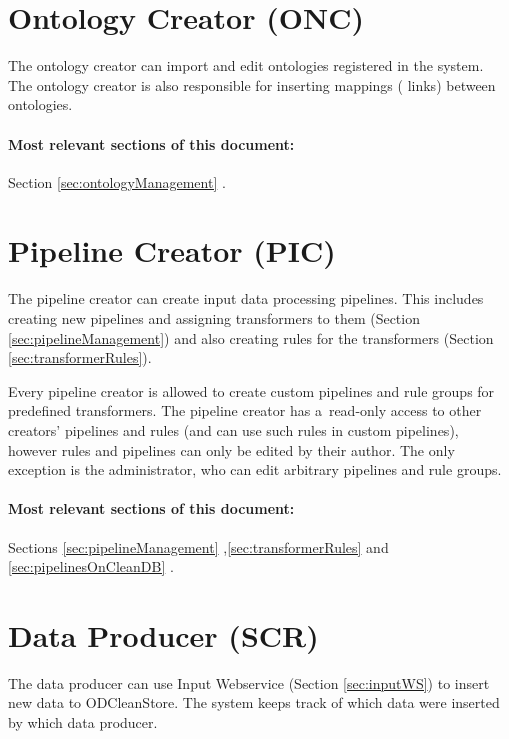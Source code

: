 \section[Ontology Creator]{Ontology Creator (ONC)}
\label{sec:onc}
	The ontology creator can import and edit ontologies registered in the system. The ontology creator is also responsible for inserting mappings ( links) between ontologies.

	\paragraph{Most relevant sections of this document:} Section \ref{sec:ontologyManagement} .

\section[Pipeline Creator]{Pipeline Creator (PIC)}
\label{sec:pic}
	The pipeline creator can create input data processing pipelines. This includes creating new pipelines and assigning transformers to them (Section \ref{sec:pipelineManagement}) and also creating rules for the transformers (Section \ref{sec:transformerRules}).

	Every pipeline creator is allowed to create custom pipelines and rule groups for predefined transformers. The pipeline creator has a~read-only access to other creators' pipelines and rules (and can use such rules in custom pipelines), however rules and pipelines can only be edited by their author. The only exception is the administrator, who can edit arbitrary pipelines and rule groups.

	\paragraph{Most relevant sections of this document:} Sections \ref{sec:pipelineManagement} ,\linebreak[4] \ref{sec:transformerRules}  and \ref{sec:pipelinesOnCleanDB} .
	
\section[Data Producer]{Data Producer (SCR)} 
\label{sec:scr}
  The data producer can use Input Webservice (Section \ref{sec:inputWS}) to insert new data to ODCleanStore. The system keeps track of which data were inserted by which data producer.

